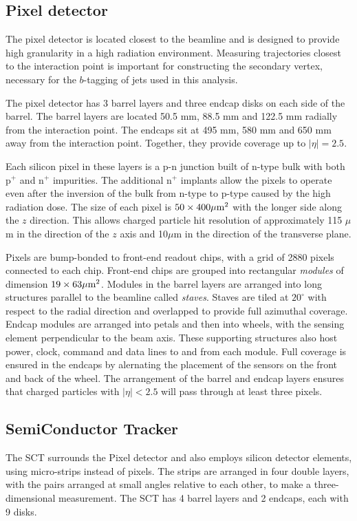 \subsection{Pixel detector}
The pixel detector is located closest to the beamline and is designed to provide high granularity in a high radiation environment. Measuring trajectories closest to the interaction point is important for constructing the secondary vertex, necessary for the $b$-tagging of jets used in this analysis.

The pixel detector has 3 barrel layers and three endcap disks on each side of the barrel. The barrel layers are located 50.5 mm, 88.5 mm and 122.5 mm radially from the interaction point. The endcaps sit at 495 mm, 580 mm and 650 mm away from the interaction point. Together, they provide coverage up to $|\eta|=2.5$.

Each silicon pixel in these layers is a p-n junction built of n-type bulk with both p$^+$ and n$^+$ impurities. The additional n$^+$ implants allow the pixels to operate even after the inversion of the bulk from n-type to p-type caused by the high radiation dose. The size of each pixel is $50 \times 400 \mu \textrm{m}^2$ with the longer side along the $z$ direction. This allows charged particle hit resolution of approximately 115 $\mu$m in the direction of the $z$ axis and 10$\mu$m in the direction of the transverse plane.

Pixels are bump-bonded to front-end readout chips, with a grid of 2880 pixels connected to each chip. Front-end chips are grouped into rectangular \emph{modules} of dimension $19 \times 63 \mu \textrm{m}^2$. Modules in the barrel layers are arranged into long structures parallel to the beamline called \emph{staves}. Staves are tiled at $20^{\circ}$ with respect to the radial direction and overlapped to provide full azimuthal coverage. Endcap modules are arranged into petals and then into wheels, with the sensing element perpendicular to the beam axis. These supporting structures also host power, clock, command and data lines to and from each module. Full coverage is ensured in the endcaps by alernating the placement of the sensors on the front and back of the wheel. The arrangement of the barrel and endcap layers ensures that charged particles with $|\eta|<2.5$ will pass through at least three pixels.

\subsection{SemiConductor Tracker}
The SCT surrounds the Pixel detector and also employs silicon detector elements, using micro-strips instead of pixels. The strips are arranged in four double layers, with the pairs arranged at small angles relative to each other, to make a three-dimensional measurement. The SCT has 4 barrel layers and 2 endcaps, each with 9 disks. 

